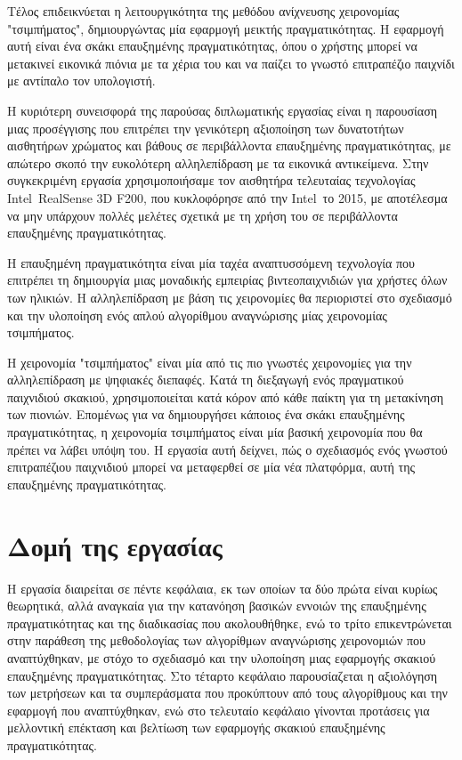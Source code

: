 Τέλος επιδεικνύεται η λειτουργικότητα της μεθόδου ανίχνευσης χειρονομίας "τσιμπήματος", δημιουργώντας μία εφαρμογή μεικτής πραγματικότητας. Η εφαρμογή αυτή είναι ένα σκάκι επαυξημένης πραγματικότητας, όπου ο χρήστης μπορεί να μετακινεί εικονικά πιόνια με τα χέρια του και να παίζει το γνωστό επιτραπέζιο παιχνίδι με αντίπαλο τον υπολογιστή.


Η κυριότερη συνεισφορά της παρούσας διπλωματικής εργασίας είναι η παρουσίαση μιας προσέγγισης που επιτρέπει την γενικότερη αξιοποίηση των δυνατοτήτων αισθητήρων χρώματος και βάθους σε περιβάλλοντα επαυξημένης πραγματικότητας, με απώτερο σκοπό την ευκολότερη αλληλεπίδραση με τα εικονικά αντικείμενα. Στην συγκεκριμένη εργασία χρησιμοποιήσαμε τον αισθητήρα τελευταίας τεχνολογίας Intel\textregistered\ RealSense\texttrademark{} 3D F200, που κυκλοφόρησε από την Intel\textregistered\ το 2015, με αποτέλεσμα να μην υπάρχουν πολλές μελέτες σχετικά με τη χρήση του σε περιβάλλοντα επαυξημένης πραγματικότητας.


Η επαυξημένη πραγματικότητα είναι μία ταχέα αναπτυσσόμενη τεχνολογία που επιτρέπει τη δημιουργία μιας μοναδικής εμπειρίας βιντεοπαιχνιδιών για χρήστες όλων των ηλικιών. Η αλληλεπίδραση με βάση τις χειρονομίες θα περιοριστεί στο σχεδιασμό και την υλοποίηση ενός απλού αλγορίθμου αναγνώρισης μίας χειρονομίας τσιμπήματος. 


Η χειρονομία "τσιμπήματος" είναι μία από τις πιο γνωστές χειρονομίες για την αλληλεπίδραση με ψηφιακές διεπαφές. Κατά τη διεξαγωγή ενός πραγματικού παιχνιδιού σκακιού, χρησιμοποιείται κατά κόρον από κάθε παίκτη για τη μετακίνηση των πιονιών. Επομένως για να δημιουργήσει κάποιος ένα σκάκι επαυξημένης πραγματικότητας, η χειρονομία τσιμπήματος είναι μία βασική χειρονομία που θα πρέπει να λάβει υπόψη του. Η εργασία αυτή δείχνει, πώς ο σχεδιασμός ενός γνωστού επιτραπέζιου παιχνιδιού μπορεί να μεταφερθεί σε μία νέα πλατφόρμα, αυτή της επαυξημένης πραγματικότητας.







\section{Δομή της εργασίας}


Η εργασία διαιρείται σε πέντε κεφάλαια, εκ των οποίων τα δύο πρώτα είναι κυρίως θεωρητικά, αλλά αναγκαία για την κατανόηση βασικών εννοιών της επαυξημένης πραγματικότητας και της διαδικασίας που ακολουθήθηκε, ενώ το τρίτο επικεντρώνεται στην παράθεση της μεθοδολογίας των αλγορίθμων αναγνώρισης χειρονομιών που αναπτύχθηκαν, με στόχο το σχεδιασμό και την υλοποίηση μιας εφαρμογής σκακιού επαυξημένης πραγματικότητας. Στο τέταρτο κεφάλαιο παρουσίαζεται η αξιολόγηση των μετρήσεων και τα συμπεράσματα που προκύπτουν από τους αλγορίθμους και την εφαρμογή που αναπτύχθηκαν, ενώ στο τελευταίο κεφάλαιο γίνονται προτάσεις για μελλοντική επέκταση και βελτίωση των εφαρμογής σκακιού επαυξημένης πραγματικότητας.




